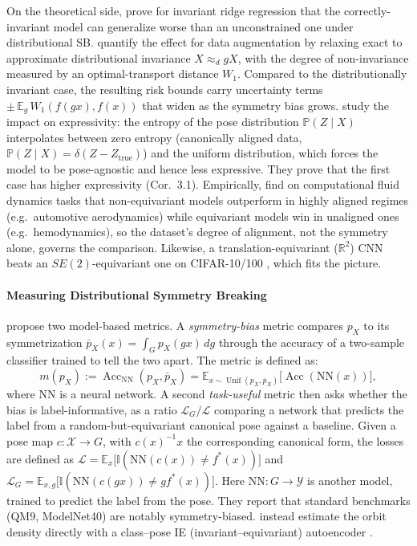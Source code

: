 \documentclass[mathematics,review,submit,moreauthors]{Definitions/mdpi}
\begin{document}
On the theoretical side, \citet{lawrence2026} prove for invariant ridge regression that the correctly-invariant model can generalize worse than an unconstrained one under distributional SB.
\citet{chen2020} quantify the effect for data augmentation by relaxing exact to approximate distributional invariance $X\approx_d gX$, with the degree of non-invariance measured by an optimal-transport distance $W_1$.
Compared to the distributionally invariant case, the resulting risk bounds carry uncertainty terms $\pm\,\mathbb{E}_g\,W_1(f(gx),f(x))$ that widen as the symmetry bias grows.
\citet{vadgama2025} study the impact on expressivity: the entropy of the pose distribution $\mathbb{P}(Z\mid X)$ interpolates between zero entropy (canonically aligned data, $\mathbb{P}(Z\mid X)=\delta(Z-Z_{\mathrm{true}})$) and the uniform distribution, which forces the model to be pose-agnostic and hence less expressive.
They prove that the first case has higher expressivity (Cor.~3.1).
Empirically, \citet{rygiel2026} find on computational fluid dynamics tasks that non-equivariant models outperform in highly aligned regimes (e.g.\ automotive aerodynamics) while equivariant models win in unaligned ones (e.g.\ hemodynamics), so the dataset's degree of alignment, not the symmetry alone, governs the comparison.
Likewise, a translation-equivariant ($\mathbb{R}^2$) CNN beats an $SE(2)$-equivariant one on CIFAR-10/100 \citep[Tab.~4]{romero2023}, which fits the picture.

\paragraph{Measuring Distributional Symmetry Breaking}
\citet{lawrence2026} propose two model-based metrics.
A \emph{symmetry-bias} metric compares $p_X$ to its symmetrization $\bar p_X(x)=\int_G p_X(gx)\,dg$ through the accuracy of a two-sample classifier trained to tell the two apart.
The metric is defined as:
$$m(p_X):=\operatorname{Acc}_{\mathrm{NN}}(p_X, \bar p_X)=\mathbb{E}_{x\sim \operatorname{Unif}(p_X, \bar p_X)}\big[\operatorname{Acc}(\mathrm{NN}(x))\big],$$
where $\mathrm{NN}$ is a neural network.
A second \emph{task-useful} metric then asks whether the bias is label-informative, as a ratio $\mathcal{L}_G/\mathcal{L}$ comparing a network that predicts the label from a random-but-equivariant canonical pose against a baseline.
Given a pose map $c:\mathcal{X}\to G$, with $c(x)^{-1}x$ the corresponding canonical form, the losses are defined as $\mathcal{L}=\mathbb{E}_x\big[\mathbb{I}(\mathrm{NN}(c(x))\neq f^*(x))\big]$ and $\mathcal{L}_G=\mathbb{E}_{x,g}\big[\mathbb{I}(\mathrm{NN}(c(gx))\neq gf^*(x))\big]$. Here $\mathrm{NN}:G\to\mathcal{Y}$ is another model, trained to predict the label from the pose.
They report that standard benchmarks (QM9, ModelNet40) are notably symmetry-biased.
\citet{urbano2026} instead estimate the orbit density directly with a class--pose IE (invariant--equivariant) autoencoder \citep{winter2022anips}.
\end{document}
